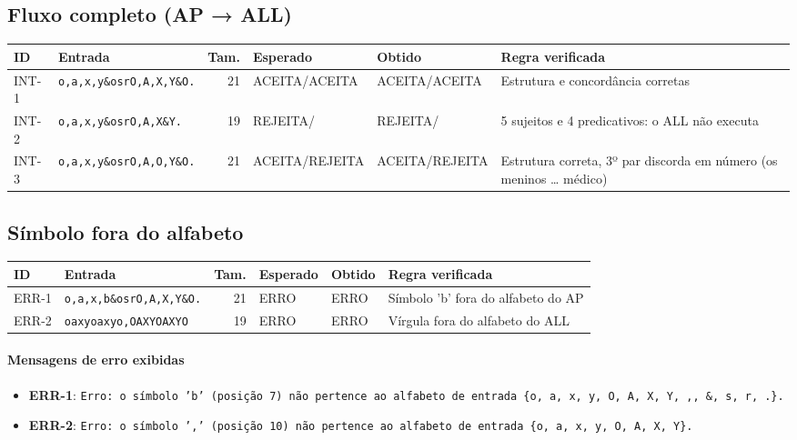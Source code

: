 \subsection*{Fluxo completo (AP → ALL)}
{\footnotesize\setlength{\tabcolsep}{3pt}\begin{longtable}{l p{4cm} r p{2cm} p{2cm} p{3.8cm}}
\textbf{ID} & \textbf{Entrada} & \textbf{Tam.} & \textbf{Esperado} & \textbf{Obtido} & \textbf{Regra verificada} \\ \hline \endhead
INT-1 & \texttt{o,\allowbreak{}a,\allowbreak{}x,\allowbreak{}y\&osrO,\allowbreak{}A,\allowbreak{}X,\allowbreak{}Y\&O.} & 21 & ACEITA/\allowbreak{}ACEITA & ACEITA/\allowbreak{}ACEITA & Estrutura e concordância corretas \\
INT-2 & \texttt{o,\allowbreak{}a,\allowbreak{}x,\allowbreak{}y\&osrO,\allowbreak{}A,\allowbreak{}X\&Y.} & 19 & REJEITA/\allowbreak{}\textemdash{} & REJEITA/\allowbreak{}\textemdash{} & 5 sujeitos e 4 predicativos: o ALL não executa \\
INT-3 & \texttt{o,\allowbreak{}a,\allowbreak{}x,\allowbreak{}y\&osrO,\allowbreak{}A,\allowbreak{}O,\allowbreak{}Y\&O.} & 21 & ACEITA/\allowbreak{}REJEITA & ACEITA/\allowbreak{}REJEITA & Estrutura correta, 3º par discorda em número (os meninos \ldots{} médico) \\
\end{longtable}}
\subsection*{Símbolo fora do alfabeto}
{\footnotesize\setlength{\tabcolsep}{3pt}\begin{longtable}{l p{4cm} r p{2cm} p{2cm} p{3.8cm}}
\textbf{ID} & \textbf{Entrada} & \textbf{Tam.} & \textbf{Esperado} & \textbf{Obtido} & \textbf{Regra verificada} \\ \hline \endhead
ERR-1 & \texttt{o,\allowbreak{}a,\allowbreak{}x,\allowbreak{}b\&osrO,\allowbreak{}A,\allowbreak{}X,\allowbreak{}Y\&O.} & 21 & ERRO & ERRO & Símbolo 'b' fora do alfabeto do AP \\
ERR-2 & \texttt{oaxyoaxyo,\allowbreak{}OAXYOAXYO} & 19 & ERRO & ERRO & Vírgula fora do alfabeto do ALL \\
\end{longtable}}
\paragraph{Mensagens de erro exibidas}
{\footnotesize\raggedright\begin{itemize}
\item \textbf{ERR-1}: \texttt{Erro: o símbolo 'b' (posição 7) não pertence ao alfabeto de entrada \{o, a, x, y, O, A, X, Y, ,, \&, s, r, .\}.}
\item \textbf{ERR-2}: \texttt{Erro: o símbolo ',' (posição 10) não pertence ao alfabeto de entrada \{o, a, x, y, O, A, X, Y\}.}
\end{itemize}}
